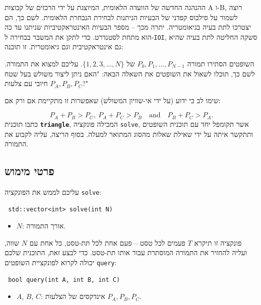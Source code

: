\documentclass[12pt]{article}
\begin{document}
\renewcommand{\headerLang}{עברית}
\renewcommand{\problemName}{AB23. משולש}

\renewcommand{\headerLeft}{IATI יום 2, קבוצת בוגרים}
\renewcommand{\headerRightFirst}{הטורניר הבינלאומי המתקדם ה-17 במדעי המחשב}
\renewcommand{\headerRightSecond}{אונליין 2026}

\renewcommand{\tl}{$10$ שניות}
\renewcommand{\ml}{$1024$ MB}
\problem{משימה \problemName}


ההנהגה החדשה של הוועדה הלאומית, המיוצגת על ידי הרכזים של קבוצות A ו-B, רוצה לשמור על סילבוס קפדני של הבעיות הניתנות לבחירת הנבחרת הלאומית. לשם כך, הם יצטרכו לתת בעיה בגיאומטריה. יתרה מכך -- מספר הבעיות האינטראקטיביות שניתנו עד כה הוא מתחת לסטנדרט. כדי לתקן את המשבר בבחירה ל-\foreignlanguage{english}{\texttt{IOI}}, סשקה החליטה לתת בעיה שהיא גם אינטראקטיבית וגם גיאומטרית. זו תוכנה:

השופטים הסתירו תמורה $P_0,P_1,...,P_{N-1}$ של $\{1,2,3,...,N\}$. עליכם למצוא את התמורה. לשם כך, תוכלו לשאול את השופטים את השאלה הבאה: "האם ניתן ליצור משולש בעל שטח חיובי עם צלעות $P_A,P_B,P_C$?"

שימו לב כי ידוע (על ידי אי-שוויון המשולש) שאפשרות זו מתקיימת אם ורק אם:

\[P_A + P_B > P_C,\ P_A + P_C > P_B \quad \text{and} \quad P_B + P_C > P_A.\]
כתבו תוכנית \foreignlanguage{english}{\textbf{\texttt{triangle}}}, המכילה פונקציה \foreignlanguage{english}{\texttt{solve}}, אשר תקומפל יחד עם תוכנית השופטים ותתקשר איתה על ידי שאילת שאלות מהסוג המתואר למעלה. בסוף הריצה, עליה לקבוע את התמורה.


\subsection{פרטי מימוש}
עליכם לממש את הפונקציה \foreignlanguage{english}{\texttt{solve}}:
\begin{otherlanguage}{english}
\begin{lstlisting}
 std::vector<int> solve(int N)
\end{lstlisting}
\end{otherlanguage}
\begin{itemize}
    \item $N$: אורך התמורה.
\end{itemize}

פונקציה זו תיקרא $T$ פעמים לכל טסט -- פעם אחת לכל תת-טסט, כל אחת עם $N$ שווה, ועליה להחזיר את התמורה המוסתרת עבור אותו תת-טסט. כדי לבצע זאת, התוכנית שלכם יכולה לקרוא לפונקציית השופטים \foreignlanguage{english}{\texttt{query}}:
\begin{otherlanguage}{english}
\begin{lstlisting}
 bool query(int A, int B, int C)
\end{lstlisting}
\end{otherlanguage}
\begin{itemize}
    \item $A$, $B$, $C$: אינדקסים של הצלעות $P_A, P_B, P_C$.
\end{itemize}
\end{document}
